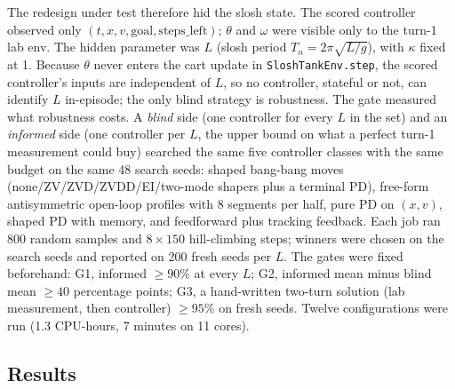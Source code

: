 \documentclass[11pt,a4paper]{article}
\begin{document}
The redesign under test therefore hid the slosh state. The scored controller
observed only $(t, x, v, \text{goal}, \text{steps\_left})$; $\theta$ and
$\omega$ were visible only to the turn-1 lab env. The hidden parameter was
$L$ (slosh period $T_n = 2\pi\sqrt{L/g}$), with $\kappa$ fixed at 1. Because
$\theta$ never enters the cart update in \texttt{SloshTankEnv.step}, the
scored controller's inputs are independent of $L$, so no controller, stateful
or not, can identify $L$ in-episode; the only blind strategy is robustness.
The gate measured what robustness costs. A \emph{blind} side (one controller
for every $L$ in the set) and an \emph{informed} side (one controller per
$L$, the upper bound on what a perfect turn-1 measurement could buy) searched
the same five controller classes with the same budget on the same 48 search
seeds: shaped bang-bang moves (none/ZV/ZVD/ZVDD/EI/two-mode shapers plus a
terminal PD), free-form antisymmetric open-loop profiles with 8 segments per
half, pure PD on $(x,v)$, shaped PD with memory, and feedforward plus
tracking feedback. Each job ran 800 random samples and $8\times150$
hill-climbing steps; winners were chosen on the search seeds and reported on
200 fresh seeds per $L$. The gates were fixed beforehand: G1, informed
$\geq 90\%$ at every $L$; G2, informed mean minus blind mean $\geq 40$
percentage points; G3, a hand-written two-turn solution (lab measurement,
then controller) $\geq 95\%$ on fresh seeds. Twelve configurations were run
(1.3 CPU-hours, 7 minutes on 11 cores).

\subsection*{Results}
\end{document}
